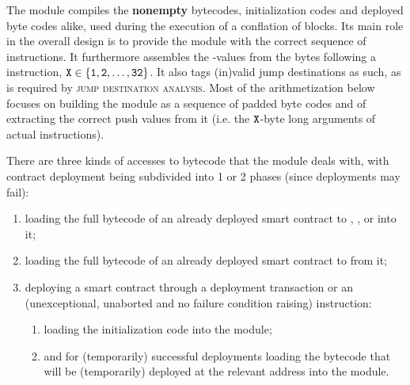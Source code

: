The \romMod{} module compiles the \textbf{nonempty} bytecodes, initialization codes and deployed byte codes alike, used during the execution of a conflation of blocks.
Its main role in the overall design is to provide the \hubMod{} module with the correct sequence of instructions.
It furthermore assembles the -values from the bytes following a  instruction, $\texttt{X} \in \{ \texttt{1}, \texttt{2}, \dots, \texttt{32} \}$.
It also tags (in)valid jump destinations as such, as is required by \textsc{jump destination analysis}.
Most of the arithmetization below focuses on building the \romMod{} module as a sequence of padded byte codes and of extracting the correct push values from it (i.e. the $\texttt{X}$-byte long arguments of actual  instructions).

There are three kinds of accesses to bytecode that the \romMod{} module  deals with, with contract deployment being subdivided into 1 or 2 phases (since deployments may fail):
\begin{enumerate}
    \item loading the full bytecode of an already deployed smart contract to , ,  or  into it;
    \item loading the full bytecode of an already deployed smart contract to  from it;
    \item deploying a smart contract through a deployment transaction or an (unexceptional, unaborted and no failure condition raising)  instruction:
        \begin{enumerate}
            \item loading the initialization code into the \romMod{} module;
            \item and for (temporarily) successful deployments loading the bytecode that will be (temporarily) deployed at the relevant address into the \romMod{} module.
        \end{enumerate}
\end{enumerate}
